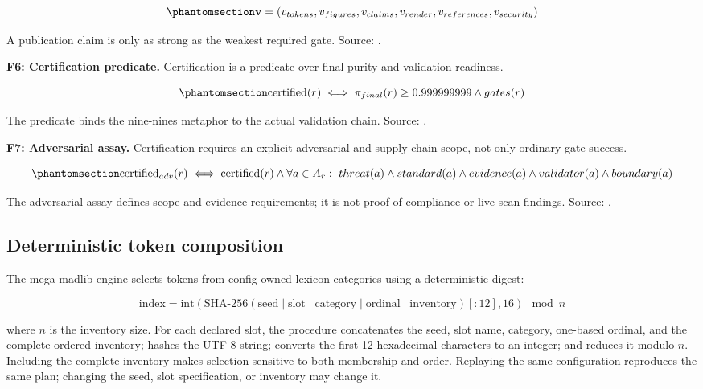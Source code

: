 \documentclass[
  english,
]{article}
\begin{document}
\begin{equation}\protect\phantomsection\label{eq:integrity_vector}{
\mathbf{v} = (v_{tokens}, v_{figures}, v_{claims}, v_{render}, v_{references}, v_{security})
}\end{equation}

A publication claim is only as strong as the weakest required gate.
Source: .

\textbf{F6: Certification predicate.} Certification is a predicate over
final purity and validation readiness.

\begin{equation}\protect\phantomsection\label{eq:certification_predicate}{
\operatorname{certified}(r) \iff \pi_{final}(r) \geq 0.999999999 \land gates(r)
}\end{equation}

The predicate binds the nine-nines metaphor to the actual validation
chain. Source:
.

\textbf{F7: Adversarial assay.} Certification requires an explicit
adversarial and supply-chain scope, not only ordinary gate success.

\begin{equation}\protect\phantomsection\label{eq:adversarial_assay}{
\operatorname{certified}_{adv}(r) \iff \operatorname{certified}(r) \land \forall a \in A_r:\ threat(a) \land standard(a) \land evidence(a) \land validator(a) \land boundary(a)
}\end{equation}

The adversarial assay defines scope and evidence requirements; it is not
proof of compliance or live scan findings. Source:
.

\subsection{Deterministic token
composition}\label{deterministic-token-composition}

The mega-madlib engine selects tokens from config-owned lexicon
categories using a deterministic digest:

\[
\text{index} = \text{int}\left(\text{SHA-256}\left(\text{seed} \mid \text{slot} \mid \text{category} \mid \text{ordinal} \mid \text{inventory}\right)[:12], 16\right) \mod n
\]

where \(n\) is the inventory size. For each declared slot, the procedure
concatenates the seed, slot name, category, one-based ordinal, and the
complete ordered inventory; hashes the UTF-8 string; converts the first
12 hexadecimal characters to an integer; and reduces it modulo \(n\).
Including the complete inventory makes selection sensitive to both
membership and order. Replaying the same configuration reproduces the
same plan; changing the seed, slot specification, or inventory may
change it.
\end{document}
